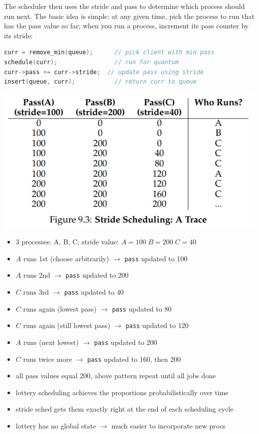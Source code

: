 The scheduler then uses the stride and pass to determine which process should run next. The basic idea is simple: at any given time, pick the process to run that has the  pass value so far; when you run a process, increment its pass counter by its stride:
\begin{lstlisting}[language=c]
curr = remove_min(queue);      // pick client with min pass
schedule(curr);                // run for quantum
curr->pass += curr->stride;  // update pass using stride
insert(queue, curr);           // return curr to queue
\end{lstlisting}
\includegraphics[width=\linewidth]{imgs/sched_stride}
\begin{itemize}
\item 3 processes: A, B, C; stride value: $A = 100\;B = 200\; C=40$
\item $A$ runs 1st (choose arbitrarily) $\to$ \texttt{pass} updated to 100
\item $A$ runs 2nd  $\to$  \texttt{pass} updated to 200
\item $C$ runs 3rd  $\to$  \texttt{pass} updated to 40
\item $C$ runs again (lowest pass)  $\to$  \texttt{pass} updated to 80
\item $C$ runs again (still lowest pass) $\to$ \texttt{pass} updated to 120
\item $A$ runs (next lowest) $\to$  \texttt{pass} updated to 200
\item $C$ runs twice more $\to$ \texttt{pass} updated to 160, then 200
\item all pass values equal 200, above pattern repeat until all jobs done
\item lottery scheduling achieves the proportions probabilistically over time
\item stride sched gets them exactly right at the end of each scheduling cycle
\item lottery has no global state $\to$ much easier to incorporate new procs
\end{itemize}
